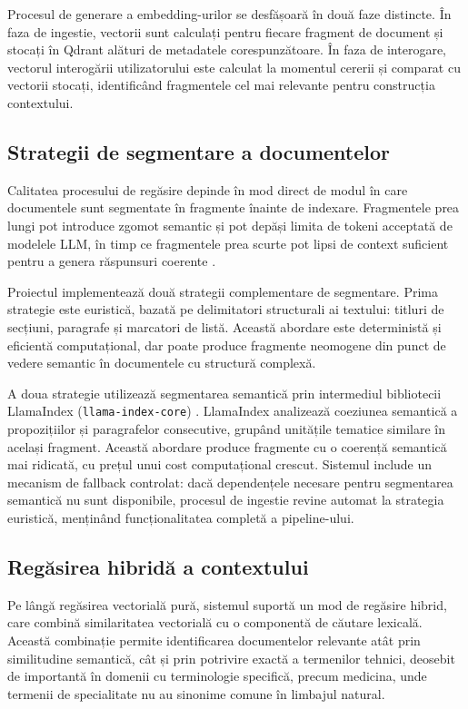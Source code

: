 \documentclass[12pt, a4paper, oneside, romanian]{teza-upb}
\begin{document}
Procesul de generare a embedding-urilor se desfășoară în două faze distincte. În faza de ingestie, vectorii sunt calculați pentru fiecare fragment de document și stocați în Qdrant alături de metadatele corespunzătoare. În faza de interogare, vectorul interogării utilizatorului este calculat la momentul cererii și comparat cu vectorii stocați, identificând fragmentele cel mai relevante pentru construcția contextului.

\subsection{Strategii de segmentare a documentelor}

Calitatea procesului de regăsire depinde în mod direct de modul în care documentele sunt segmentate în fragmente înainte de indexare. Fragmentele prea lungi pot introduce zgomot semantic și pot depăși limita de tokeni acceptată de modelele LLM, în timp ce fragmentele prea scurte pot lipsi de context suficient pentru a genera răspunsuri coerente \cite{lewis2020retrieval}.

Proiectul implementează două strategii complementare de segmentare. Prima strategie este euristică, bazată pe delimitatori structurali ai textului: titluri de secțiuni, paragrafe și marcatori de listă. Această abordare este deterministă și eficientă computațional, dar poate produce fragmente neomogene din punct de vedere semantic în documentele cu structură complexă.

A doua strategie utilizează segmentarea semantică prin intermediul bibliotecii LlamaIndex (\texttt{llama-index-core}) \cite{llamaindex_doc}. LlamaIndex analizează coeziunea semantică a propozițiilor și paragrafelor consecutive, grupând unitățile tematice similare în același fragment. Această abordare produce fragmente cu o coerență semantică mai ridicată, cu prețul unui cost computațional crescut. Sistemul include un mecanism de fallback controlat: dacă dependențele necesare pentru segmentarea semantică nu sunt disponibile, procesul de ingestie revine automat la strategia euristică, menținând funcționalitatea completă a pipeline-ului.

\subsection{Regăsirea hibridă a contextului}

Pe lângă regăsirea vectorială pură, sistemul suportă un mod de regăsire hibrid, care combină similaritatea vectorială cu o componentă de căutare lexicală. Această combinație permite identificarea documentelor relevante atât prin similitudine semantică, cât și prin potrivire exactă a termenilor tehnici, deosebit de importantă în domenii cu terminologie specifică, precum medicina, unde termenii de specialitate nu au sinonime comune în limbajul natural.
\end{document}
